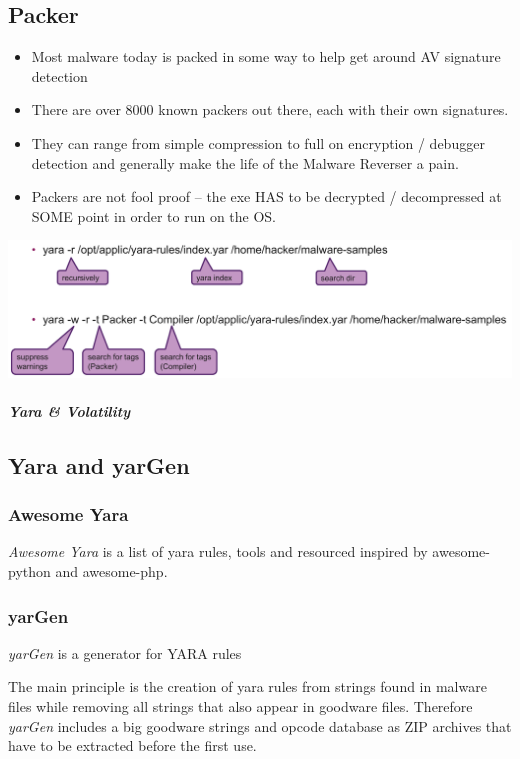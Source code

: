 \subsection{Packer}
\begin{itemize}
    \item Most malware today is packed in some way to help get around AV signature detection
    \item There are over 8000 known packers out there, each with their own signatures.
    \item They can range from simple compression to full on encryption / debugger detection and generally make the life of the Malware Reverser a pain.
    \item Packers are not fool proof – the exe HAS to be decrypted / decompressed at SOME point in order to run on the OS.
\end{itemize}
\includegraphics[width=\linewidth]{./img/12-yara/yara_cli.png}

\subparagraph{Yara \& Volatility}
\subsection{Yara and yarGen}

\subsubsection{Awesome Yara}
\textit{Awesome Yara} is a list of yara rules, tools and resourced inspired by awesome-python and awesome-php.

\subsubsection{yarGen}
\textit{yarGen} is a generator for YARA rules

The main principle is the creation of yara rules from strings found in malware files while removing all strings that also appear in goodware files. Therefore \textit{yarGen} includes a big goodware strings and opcode database as ZIP archives that have to be extracted before the first use.

